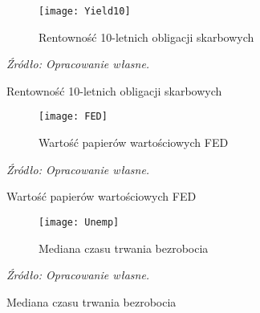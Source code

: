 \vspace{-1cm}

\hypertarget{fig105}{}
\begin{figure}[H]
\ContinuedFloat
\centering
\begin{subfigure}{.5\textwidth}
\caption{Rentowność 10-letnich obligacji skarbowych}
\hspace{-3cm}\texttt{[image: Yield10]}
\end{subfigure}
\vspace{-0.75cm}
\begin{flushleft}
\hspace{1cm}\textit{\footnotesize{Źródło: Opracowanie własne.}} \\
\end{flushleft}
\end{figure}

\vspace{-1cm}

\hypertarget{fig106}{}
\begin{figure}[H]
\ContinuedFloat
\centering
\begin{subfigure}{.5\textwidth}
\caption{Wartość papierów wartościowych FED}
\hspace{-3cm}\texttt{[image: FED]}
\end{subfigure}
\vspace{-0.75cm}
\begin{flushleft}
\hspace{1cm}\textit{\footnotesize{Źródło: Opracowanie własne.}} \\
\end{flushleft}
\end{figure}

\vspace{-1cm}

\hypertarget{fig107}{}
\begin{figure}[H]
\ContinuedFloat
\centering
\begin{subfigure}{.5\textwidth}
\caption{Mediana czasu trwania bezrobocia}
\hspace{-3cm}\texttt{[image: Unemp]}
\end{subfigure}
\vspace{-0.75cm}
\begin{flushleft}
\hspace{1cm}\textit{\footnotesize{Źródło: Opracowanie własne.}} \\
\end{flushleft}
\end{figure}

